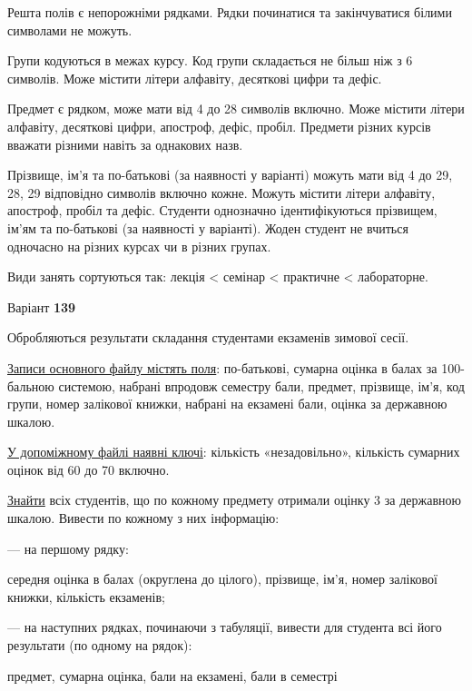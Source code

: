 \documentclass[11pt, ukrainian]{article}
\begin{document}
Решта полів є непорожніми рядками.
Рядки починатися та закінчуватися білими символами не можуть.

Групи кодуються в межах курсу.
Код групи складається не більш ніж з 6 символів.
Може містити літери алфавіту, десяткові цифри та дефіс.

Предмет є рядком, може мати від 4 до 28 символів включно.
Може містити літери алфавіту, десяткові цифри, апостроф, дефіс, пробіл.
Предмети різних курсів вважати різними навіть за однакових назв.

Прізвище, ім’я та по-батькові (за наявності у варіанті)
можуть мати від 4 до 29, 28, 29 відповідно символів включно кожне.
Можуть містити літери алфавіту, апостроф, пробіл та дефіс.
Студенти однозначно ідентифікуються прізвищем, ім’ям та по-батькові (за наявності у варіанті).
Жоден студент не вчиться одночасно на різних курсах чи в різних групах.

Види занять сортуються так: лекція < семінар < практичне < лабораторне.





\par
\newpage

{\center Варіант  \No \textbf { 139 }\par}
\bigskip
Обробляються результати складання студентами екзаменів зимової сесії.

\underline{Записи основного файлу містять поля}: по-батькові, сумарна оцінка в балах за 100-бальною системою, набрані впродовж семестру бали, предмет, прізвище, ім’я, код групи, номер залікової книжки, набрані на екзамені бали, оцінка за державною шкалою.

\underline{У допоміжному файлі наявні ключі}: кількість «незадовільно», кількість сумарних оцінок від 60 до 70 включно.

\underline{Знайти} всіх студентів, що по кожному предмету отримали оцінку 3 за державною шкалою. Вивести по кожному з них інформацію:\par
{\noindent}--- на першому рядку:\par
середня оцінка в балах (округлена до цілого), прізвище, ім’я, номер залікової книжки, кількість екзаменів;

{\noindent}--- на наступних рядках, починаючи з табуляції, вивести для студента всі його результати (по одному на рядок):\par
предмет, сумарна оцінка, бали на екзамені, бали в семестрі
\end{document}
